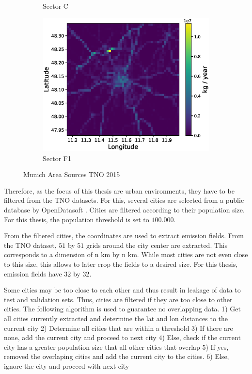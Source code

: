 \begin{figure}
\begin{subfigure}{0.32\textwidth}
        \caption{Sector C}
    \end{subfigure}
    \begin{subfigure}{0.32\textwidth}
        \centering
        \includegraphics[width=\linewidth]{figures/03_dataset/munich/munich_2015_sector_f1.eps}
        \caption{Sector F1}
    \end{subfigure}
    \caption{Munich Area Sources TNO 2015}
    \label{fig:munich_emissions}
\end{figure}
Therefore, as the focus of this thesis are urban environments, they have to be filtered from the TNO datasets.
For this, several cities are selected from a public database by OpenDatasoft \parencite{OpenDataSoft}.
Cities are filtered according to their population size.
For this thesis, the population threshold is set to $100.000$.

From the filtered cities, the coordinates are used to extract emission fields.
From the TNO dataset, $51$ by $51$ grids around the city center are extracted.
This corresponds to a dimension of n km by n km.
While most cities are not even close to this size, this allows to later crop the fields to a desired size.
For this thesis, emission fields have $32$ by $32$.

Some cities may be too close to each other and thus result in leakage of data to test and validation sets.
Thus, cities are filtered if they are too close to other cities.
The following algorithm is used to guarantee no overlapping data.
1) Get all cities currently extracted and determine the lat and lon distances to the current city
2) Determine all cities that are within a threshold
3) If there are none, add the current city and proceed to next city
4) Else, check if the current city has a greater population size that all other cities that overlap
5) If yes, removed the overlaping cities and add the current city to the cities.
6) Else, ignore the city and proceed with next city

